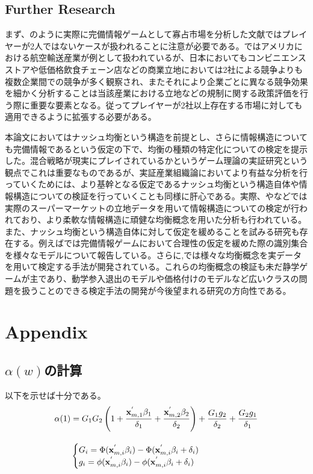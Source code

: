 \documentclass{jsarticle}
\begin{document}
\subsection{Further Research}
まず、\cite{Ciliberto2009a}のように実際に完備情報ゲームとして寡占市場を分析した文献ではプレイヤーが2人ではないケースが扱われることに注意が必要である。\cite{Ciliberto2009a}ではアメリカにおける航空輸送産業が例として扱われているが、日本においてもコンビニエンスストアや低価格飲食チェーン店などの商業立地においては2社による競争よりも複数企業間での競争が多く観察され、またそれにより企業ごとに異なる競争効果を細かく分析することは当該産業における立地などの規制に関する政策評価を行う際に重要な要素となる。従ってプレイヤーが2社以上存在する市場に対しても適用できるように拡張する必要がある。

本論文においてはナッシュ均衡という構造を前提とし、さらに情報構造についても完備情報であるという仮定の下で、均衡の種類の特定化についての検定を提示した。混合戦略が現実にプレイされているかというゲーム理論の実証研究という観点でこれは重要なものであるが、実証産業組織論においてより有益な分析を行っていくためには、より基幹となる仮定であるナッシュ均衡という構造自体や情報構造についての検証を行っていくことも同様に肝心である。実際、\cite{Grieco2014a}や\cite{Magnolfi2015}などでは実際のスーパーマーケットの立地データを用いて情報構造についての検定が行われており、より柔軟な情報構造に頑健な均衡概念を用いた分析も行われている。また、ナッシュ均衡という構造自体に対して仮定を緩めることを試みる研究も存在する。例えば\cite{Aradillas-Lopez2008}では完備情報ゲームにおいて合理性の仮定を緩めた際の識別集合を様々なモデルについて報告している。さらに\cite{Kashaev2017},\cite{Kashaev2016}では様々な均衡概念を実データを用いて検定する手法が開発されている。これらの均衡概念の検証も未だ静学ゲームが主であり、動学参入退出のモデルや価格付けのモデルなど広いクラスの問題を扱うことのできる検定手法の開発が今後望まれる研究の方向性である。


\section{Appendix}
\subsection{$\alpha(w)$の計算}
以下を示せば十分である。
\begin{align*}
	\alpha(1)& = G_1 G_2 \left( 1 + \frac{{\bf x}_{m, 1}^{'} \beta_1}{\delta_1} + \frac{{\bf x}_{m, 2}^{'} \beta_2}{\delta_2} \right) + \frac{G_1g_2}{\delta_2} + \frac{G_2g_1}{\delta_1}\\[10pt]
	&\begin{cases}
	G_i =  \Phi({\bf x}_{m, i}^{'} \beta_i) - \Phi({\bf x}_{m, i}^{'} \beta_i  + \delta_i)\\
	g_i = \phi({\bf x}_{m, i}^{'} \beta_i) - \phi({\bf x}_{m, i}^{'} \beta_i  + \delta_i)
	\end{cases}
\end{align*}
\end{document}
